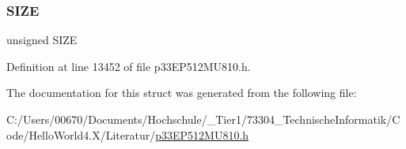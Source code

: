 \subsubsection{\texorpdfstring{S\+I\+ZE}{SIZE}}
{\footnotesize\ttfamily unsigned S\+I\+ZE}



Definition at line 13452 of file p33\+E\+P512\+M\+U810.\+h.



The documentation for this struct was generated from the following file\+:\begin{DoxyCompactItemize}
\item 
C\+:/\+Users/00670/\+Documents/\+Hochschule/\+\_\+\+Tier1/73304\+\_\+\+Technische\+Informatik/\+Code/\+Hello\+World4.\+X/\+Literatur/\hyperlink{p33_e_p512_m_u810_8h}{p33\+E\+P512\+M\+U810.\+h}\end{DoxyCompactItemize}
